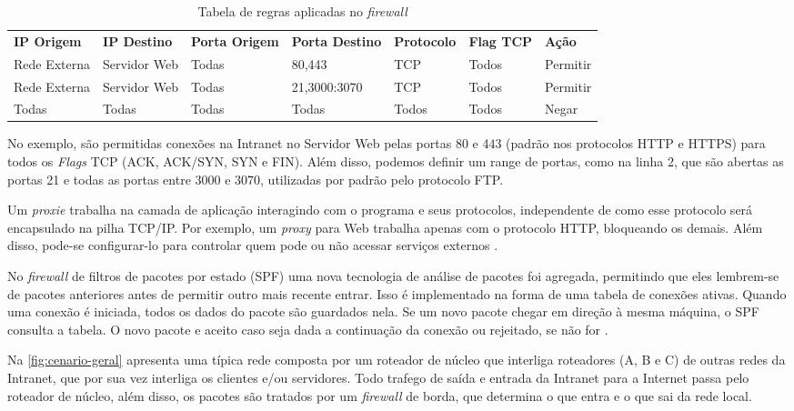 \begin{table}[htb]
\ABNTEXfontereduzida
\centering
\caption{Tabela de regras aplicadas no \textit{firewall}}
\label{tab:firewall-regras}
\begin{tabular}{l|l|l|l|l|l|l}
    \textbf{IP Origem} & \textbf{IP Destino}  & \textbf{Porta Origem}  & \textbf{Porta Destino} & \textbf{Protocolo} & \textbf{Flag TCP} & \textbf{Ação} \\
    Rede Externa & Servidor Web & Todas & 80,443 & TCP & Todos & Permitir \\
    Rede Externa & Servidor Web & Todas & 21,3000:3070 & TCP & Todos & Permitir \\
    Todas & Todas & Todas & Todas & Todos & Todos & Negar \\
\end{tabular}
\end{table}

No exemplo, são permitidas conexões na Intranet no Servidor Web pelas portas 80 e 443 (padrão nos protocolos HTTP e HTTPS) para todos os \textit{Flags} TCP (ACK, ACK/SYN, SYN e FIN). Além disso, podemos definir um range de portas, como na linha 2, que são abertas as portas 21 e todas as portas entre 3000 e 3070, utilizadas por padrão pelo protocolo FTP.

Um \textit{proxie} trabalha na camada de aplicação interagindo com o programa e seus protocolos, independente de como esse protocolo será encapsulado na pilha TCP/IP. Por exemplo, um \textit{proxy} para Web trabalha apenas com o protocolo HTTP, bloqueando os demais. Além disso, pode-se configurar-lo para controlar quem pode ou não acessar serviços externos \cite{univhacker}.

No \textit{firewall} de filtros de pacotes por estado (SPF) uma nova tecnologia de análise de pacotes foi agregada, permitindo que eles lembrem-se de pacotes anteriores antes de permitir outro mais recente entrar. Isso é implementado na forma de uma tabela de conexões ativas. Quando uma conexão é iniciada, todos os dados do pacote são guardados nela. Se um novo pacote chegar em direção à mesma máquina, o SPF consulta a tabela. O novo pacote e aceito caso seja dada a continuação da conexão ou rejeitado, se não for \cite{univhacker}.

Na \autoref{fig:cenario-geral} apresenta uma típica rede composta por um roteador de núcleo que interliga roteadores (A, B e C) de outras redes da Intranet, que por sua vez interliga os clientes e/ou servidores. Todo trafego de saída e entrada da Intranet para a Internet passa pelo roteador de núcleo, além disso, os pacotes são tratados por um \textit{firewall} de borda, que determina o que entra e o que sai da rede local.

